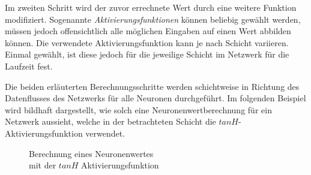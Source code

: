Im zweiten Schritt wird der zuvor errechnete Wert durch eine weitere Funktion
modifiziert. Sogenannte \emph{Aktivierungsfunktionen} können beliebig gewählt
werden, müssen jedoch offensichtlich alle möglichen Eingaben auf einen Wert
abbilden können. Die verwendete Aktivierungsfunktion kann je nach
Schicht variieren. Einmal gewählt, ist diese jedoch für die jeweilige Schicht
im Netzwerk für die Laufzeit fest.

Die beiden erläuterten Berechnungsschritte werden schichtweise in Richtung des
Datenflusses des Netzwerks für alle Neuronen durchgeführt. Im folgenden
Beispiel wird bildhaft dargestellt, wie solch eine Neuronenwertberechnung für
ein Netzwerk aussieht, welche in der betrachteten Schicht die
$tanH$-Aktivierungsfunktion verwendet.\bigskip

\begin{figure}
    \centering
    \caption{Berechnung eines Neuronenwertes\\mit der $tanH$ Aktivierungsfunktion}
\end{figure}

